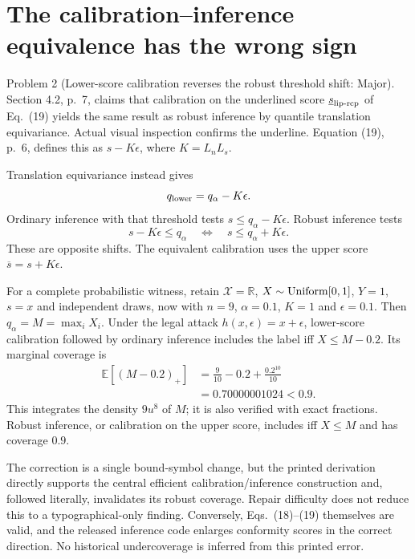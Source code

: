 \documentclass[10pt]{article}
\begin{document}
\section*{The calibration–inference equivalence has the wrong sign}
Problem 2 (Lower-score calibration reverses the robust threshold shift: Major).  Section 4.2, p. 7, claims that calibration on the underlined score \(\underline s_{\rm lip\text{-}rcp}\) of Eq. (19) yields the same result as robust inference by quantile translation equivariance. Actual visual inspection confirms the underline. Equation (19), p. 6, defines this as \(s-K\epsilon\), where \(K=L_nL_s\).\par
Translation equivariance instead gives \[q_{\rm lower}=q_\alpha-K\epsilon.\] Ordinary inference with that threshold tests \(s\le q_\alpha-K\epsilon\). Robust inference tests \[s-K\epsilon\le q_\alpha
\quad\Longleftrightarrow\quad s\le q_\alpha+K\epsilon.\] These are opposite shifts. The equivalent calibration uses the upper score \(\overline s=s+K\epsilon\).\par
For a complete probabilistic witness, retain \(\mathcal X=\mathbb R\), \(X\sim{\rm Uniform}[0,1]\), \(Y=1\), \(s=x\) and independent draws, now with \(n=9\), \(\alpha=0.1\), \(K=1\) and \(\epsilon=0.1\). Then \(q_\alpha=M=\max_iX_i\). Under the legal attack \(h(x,\epsilon)=x+\epsilon\), lower-score calibration followed by ordinary inference includes the label iff \(X\le M-0.2\). Its marginal coverage is \[\begin{aligned}
\mathbb E[(M-0.2)_+]
&=\frac9{10}-0.2+\frac{0.2^{10}}{10}\\
&=0.70000001024<0.9.\end{aligned}\] This integrates the density \(9u^8\) of \(M\); it is also verified with exact fractions. Robust inference, or calibration on the upper score, includes iff \(X\le M\) and has coverage \(0.9\).\par
The correction is a single bound-symbol change, but the printed derivation directly supports the central efficient calibration/inference construction and, followed literally, invalidates its robust coverage. Repair difficulty does not reduce this to a typographical-only finding. Conversely, Eqs. (18)–(19) themselves are valid, and the released inference code enlarges conformity scores in the correct direction. No historical undercoverage is inferred from this printed error.\par
\end{document}
